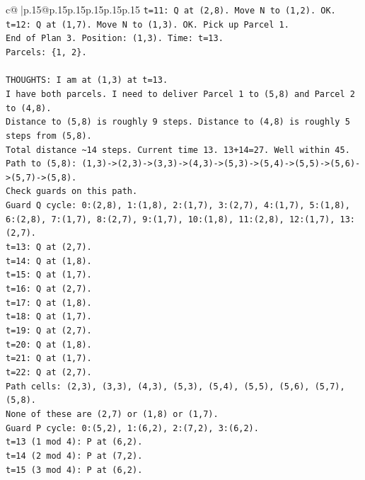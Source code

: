 \documentclass{article}
\begin{document}
{\begin{supertabular}{c@{$\;$}|p{.15\linewidth}@{}p{.15\linewidth}p{.15\linewidth}p{.15\linewidth}p{.15\linewidth}p{.15\linewidth}}
{{{\texttt{t=11: Q at (2,8). Move N to (1,2). OK.} \\
\texttt{t=12: Q at (1,7). Move N to (1,3). OK. Pick up Parcel 1.} \\
\texttt{End of Plan 3. Position: (1,3). Time: t=13.} \\
\texttt{Parcels: \{1, 2\}.} \\
\\ 
\texttt{THOUGHTS: I am at (1,3) at t=13.} \\
\texttt{I have both parcels. I need to deliver Parcel 1 to (5,8) and Parcel 2 to (4,8).} \\
\texttt{Distance to (5,8) is roughly 9 steps. Distance to (4,8) is roughly 5 steps from (5,8).} \\
\texttt{Total distance \textasciitilde{}14 steps. Current time 13. 13+14=27. Well within 45.} \\
\texttt{Path to (5,8): (1,3){-}>(2,3){-}>(3,3){-}>(4,3){-}>(5,3){-}>(5,4){-}>(5,5){-}>(5,6){-}>(5,7){-}>(5,8).} \\
\texttt{Check guards on this path.} \\
\texttt{Guard Q cycle: 0:(2,8), 1:(1,8), 2:(1,7), 3:(2,7), 4:(1,7), 5:(1,8), 6:(2,8), 7:(1,7), 8:(2,7), 9:(1,7), 10:(1,8), 11:(2,8), 12:(1,7), 13:(2,7).} \\
\texttt{t=13: Q at (2,7).} \\
\texttt{t=14: Q at (1,8).} \\
\texttt{t=15: Q at (1,7).} \\
\texttt{t=16: Q at (2,7).} \\
\texttt{t=17: Q at (1,8).} \\
\texttt{t=18: Q at (1,7).} \\
\texttt{t=19: Q at (2,7).} \\
\texttt{t=20: Q at (1,8).} \\
\texttt{t=21: Q at (1,7).} \\
\texttt{t=22: Q at (2,7).} \\
\texttt{Path cells: (2,3), (3,3), (4,3), (5,3), (5,4), (5,5), (5,6), (5,7), (5,8).} \\
\texttt{None of these are (2,7) or (1,8) or (1,7).} \\
\texttt{Guard P cycle: 0:(5,2), 1:(6,2), 2:(7,2), 3:(6,2).} \\
\texttt{t=13 (1 mod 4): P at (6,2).} \\
\texttt{t=14 (2 mod 4): P at (7,2).} \\
\texttt{t=15 (3 mod 4): P at (6,2).} \\
}}}
\end{supertabular}}
\end{document}
